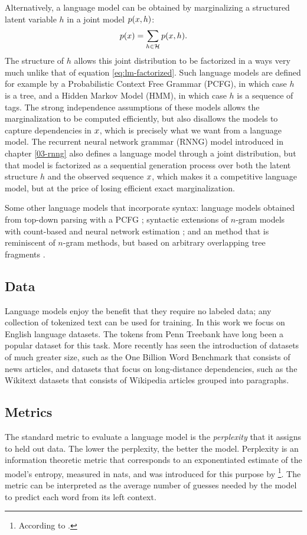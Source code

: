 
    Alternatively, a language model can be obtained by marginalizing a structured latent variable $h$ in a joint model $p(x, h)$:
    \begin{align}
      \label{eq:lm-latent}
      p( x ) = \sum_{h \in \mathcal{H}} p(x, h).
    \end{align}
    The structure of $h$ allows this joint distribution to be factorized in a ways very much unlike that of equation \ref{eq:lm-factorized}. Such language models are defined for example by a Probabilistic Context Free Grammar (PCFG), in which case $h$ is a tree, and a Hidden Markov Model (HMM), in which case $h$ is a sequence of tags. The strong independence assumptions of these models allows the marginalization to be computed efficiently, but also disallows the models to capture dependencies in $x$, which is precisely what we want from a language model. The recurrent neural network grammar (RNNG) model introduced in chapter \ref{03-rnng} also defines a language model through a joint distribution, but that model is factorized as a sequential generation process over both the latent structure $h$ and the observed sequence $x$, which makes it a competitive language model, but at the price of losing efficient exact marginalization.

    Some other language models that incorporate syntax: language models obtained from top-down parsing with a PCFG \citep{roark2001probabilistic}; syntactic extensions of $n$-gram models with count-based and neural network estimation \citep{chelba2000structured,emami2005neural}; and an method that is reminiscent of $n$-gram methods, but based on arbitrary overlapping tree fragments \citep{pauls2012treelets}.

  \subsection{Data}
    Language models enjoy the benefit that they require no labeled data; any collection of tokenized text can be used for training. In this work we focus on English language datasets. The tokens from Penn Treebank have long been a popular dataset for this task. More recently has seen the introduction of datasets of much greater size, such as the One Billion Word Benchmark \citep{chelba2013one} that consists of news articles, and datasets that focus on long-distance dependencies, such as the Wikitext datasets \citep{merity2016pointer} that consists of Wikipedia articles grouped into paragraphs.

  \subsection{Metrics}
    The standard metric to evaluate a language model is the \textit{perplexity} that it assigns to held out data. The lower the perplexity, the better the model. Perplexity is an information theoretic metric that corresponds to an exponentiated estimate of the model's entropy, measured in nats, and was introduced for this purpose by \citet{jelinek1997information}\footnote{According to \citep{chelba2017n}.}. The metric can be interpreted as the average number of guesses needed by the model to predict each word from its left context.

